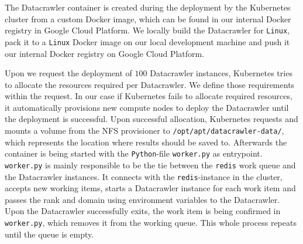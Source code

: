 The Datacrawler container is created during the deployment by the Kubernetes cluster from a custom Docker image, which can be found in our internal Docker registry in Google Cloud Platform. We locally build the Datacrawler for \texttt{Linux}, pack it to a \texttt{Linux} Docker image on our local development machine and push it our internal Docker registry on Google Cloud Platform. 

Upon we request the deployment of $100$ Datacrawler instances, Kubernetes tries to allocate the resources required per Datacrawler. We define those requirements within the request. In our case if Kubernetes fails to allocate required resources, it automatically provisions new compute nodes to deploy the Datacrawler until the deployment is successful. Upon successful allocation, Kubernetes requests and mounts a volume from the NFS provisioner to \texttt{/opt/apt/datacrawler-data/}, which represents the location where results should be saved to. Afterwards the container is being started with the \texttt{Python}-file \texttt{worker.py} as entrypoint. \texttt{worker.py} is mainly responsible to be the tie between the \texttt{redis} work queue and the Datacrawler instances. It connects with the \texttt{redis}-instance in the cluster, accepts new working items, starts a Datacrawler instance for each work item and passes the rank and domain using environment variables to the Datacrawler. Upon the Datacrawler successfully exits, the work item is being confirmed in \texttt{worker.py}, which removes it from the working queue. This whole process repeats until the queue is empty.
 

